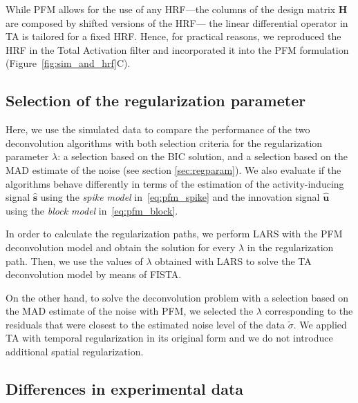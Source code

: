 While PFM allows for the use of any HRF---the columns of the design matrix \(\mathbf{H}\) are composed by shifted versions of the HRF--- the linear differential operator in TA is tailored for a fixed HRF. Hence, for practical reasons, we reproduced the HRF in the Total Activation filter and incorporated it into the PFM formulation (Figure~\ref{fig:sim_and_hrf}C).

\subsection{Selection of the regularization parameter}

Here, we use the simulated data to compare the performance of the two deconvolution algorithms with both selection criteria for the regularization parameter $\lambda$: a selection based on the BIC solution, and a selection based on the MAD estimate of the noise (see section \ref{sec:regparam}). We also evaluate if the algorithms behave differently in terms of the estimation of the activity-inducing signal $\mathbf{\hat{s}}$ using the \textit{spike model} in~\eqref{eq:pfm_spike} and the innovation signal $\mathbf{\hat{u}}$ using the \textit{block model} in~\eqref{eq:pfm_block}.

In order to calculate the regularization paths, we perform LARS with the PFM deconvolution model and obtain the solution for every $\lambda$ in the regularization path. Then, we use the values of $\lambda$ obtained with LARS to solve the TA deconvolution model by means of FISTA.

On the other hand, to solve the deconvolution problem with a selection based on the MAD estimate of the noise with PFM, we selected the $\lambda$ corresponding to the residuals that were closest to the estimated noise level of the data $\tilde{\sigma}$. We applied TA with temporal regularization in its original form and we do not introduce additional spatial regularization.

\subsection{Differences in experimental data}

